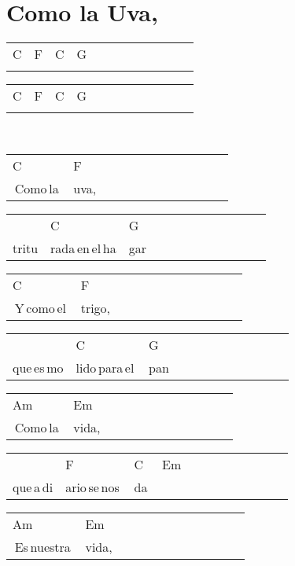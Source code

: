 \section*{Como la Uva, \hfill}
\begin{multicols}{2}
\noindent
\begin{minipage}{\columnwidth}
\noindent
\noindent
\begin{tabular}{llllllllllll}
C&F&C&G\\
\quad\quad&\quad\quad&\quad\quad&
\end{tabular}

\noindent
\begin{tabular}{llllllllllll}
C&F&C&G\\
\quad\quad&\quad\quad&\quad\quad&
\end{tabular}
\end{minipage}\\

\noindent
\begin{minipage}{\columnwidth}
\noindent
\noindent
\begin{tabular}{llllllllllll}
C&F\\
\,Como\,la\,&uva,
\end{tabular}

\noindent
\begin{tabular}{llllllllllll}
&C&G\\
tritu&rada\,en\,el\,ha&gar
\end{tabular}

\noindent
\begin{tabular}{llllllllllll}
C&F\\
\,Y\,como\,el\,&trigo,
\end{tabular}

\noindent
\begin{tabular}{llllllllllll}
&C&G\\
que\,es\,mo&lido\,para\,el\,&pan
\end{tabular}

\noindent
\begin{tabular}{llllllllllll}
Am&Em\\
\,Como\,la\,&vida,
\end{tabular}

\noindent
\begin{tabular}{llllllllllll}
&F&C&Em\\
que\,a\,di&ario\,se\,nos\,&da\,&
\end{tabular}

\noindent
\begin{tabular}{llllllllllll}
Am&Em\\
\,Es\,nuestra\,&vida,
\end{tabular}


\end{minipage}
\end{multicols}
